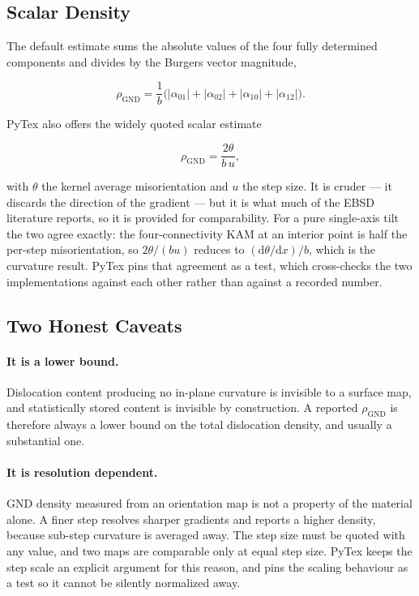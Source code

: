 \subsection{Scalar Density}

The default estimate sums the absolute values of the four fully determined
components and divides by the Burgers vector magnitude,

\[
  \rho_{\mathrm{GND}} = \frac{1}{b}
    \bigl( |\alpha_{01}| + |\alpha_{02}| + |\alpha_{10}| + |\alpha_{12}| \bigr).
\]

PyTex also offers the widely quoted scalar estimate

\[
  \rho_{\mathrm{GND}} = \frac{2\theta}{b\,u},
\]

with $\theta$ the kernel average misorientation and $u$ the step size. It is
cruder --- it discards the direction of the gradient --- but it is what much of
the EBSD literature reports, so it is provided for comparability. For a pure
single-axis tilt the two agree exactly: the four-connectivity KAM at an interior
point is half the per-step misorientation, so $2\theta/(bu)$ reduces to
$(\mathrm{d}\theta/\mathrm{d}x)/b$, which is the curvature result. PyTex pins
that agreement as a test, which cross-checks the two implementations against
each other rather than against a recorded number.

\subsection{Two Honest Caveats}

\paragraph{It is a lower bound.}
Dislocation content producing no in-plane curvature is invisible to a surface
map, and statistically stored content is invisible by construction. A reported
$\rho_{\mathrm{GND}}$ is therefore always a lower bound on the total dislocation
density, and usually a substantial one.

\paragraph{It is resolution dependent.}
GND density measured from an orientation map is not a property of the material
alone. A finer step resolves sharper gradients and reports a higher density,
because sub-step curvature is averaged away. The step size must be quoted with
any value, and two maps are comparable only at equal step size. PyTex keeps the
step scale an explicit argument for this reason, and pins the scaling behaviour
as a test so it cannot be silently normalized away.

